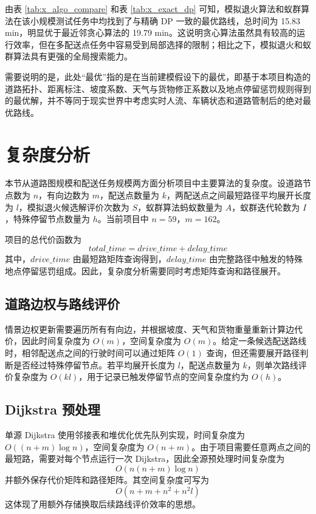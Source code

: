 \documentclass[12pt,a4paper,UTF8]{article}
\begin{document}
由表 \ref{tab:x_algo_compare} 和表 \ref{tab:x_exact_dp} 可知，模拟退火算法和蚁群算法在该小规模测试任务中均找到了与精确 DP 一致的最优路线，总时间为 15.83 min，明显优于最近邻贪心算法的 19.79 min。这说明贪心算法虽然具有较高的运行效率，但在多配送点任务中容易受到局部选择的限制；相比之下，模拟退火和蚁群算法具有更强的全局搜索能力。

需要说明的是，此处“最优”指的是在当前建模假设下的最优，即基于本项目构造的道路拓扑、距离标注、坡度系数、天气与货物修正系数以及地点停留惩罚规则得到的最优解，并不等同于现实世界中考虑实时人流、车辆状态和道路管制后的绝对最优路线。




\section{复杂度分析}

本节从道路图规模和配送任务规模两方面分析项目中主要算法的复杂度。设道路节点数为 $n$，有向边数为 $m$，配送点数量为 $k$，两配送点之间最短路径平均展开长度为 $l$，模拟退火候选解评价次数为 $S$，蚁群算法蚂蚁数量为 $A$，蚁群迭代轮数为 $I$，特殊停留节点数量为 $h$。当前项目中 $n=59$，$m=162$。

项目的总代价函数为
\[
    total\_time = drive\_time + delay\_time
\]
其中，$drive\_time$ 由最短路矩阵查询得到，$delay\_time$ 由完整路径中触发的特殊地点停留惩罚组成。因此，复杂度分析需要同时考虑矩阵查询和路径展开。

\subsection{道路边权与路线评价}

情景边权更新需要遍历所有有向边，并根据坡度、天气和货物重量重新计算边代价，因此时间复杂度为 $O(m)$，空间复杂度为 $O(m)$。给定一条候选配送路线时，相邻配送点之间的行驶时间可以通过矩阵 $O(1)$ 查询，但还需要展开路径判断是否经过特殊停留节点。若平均展开长度为 $l$，配送点数量为 $k$，则单次路线评价复杂度为 $O(kl)$，用于记录已触发停留节点的空间复杂度约为 $O(h)$。

\subsection{Dijkstra 预处理}

单源 Dijkstra 使用邻接表和堆优化优先队列实现，时间复杂度为 $O((n+m)\log n)$，空间复杂度为 $O(n+m)$。由于项目需要任意两点之间的最短路，需要对每个节点运行一次 Dijkstra，因此全源预处理时间复杂度为
\[
    O(n(n+m)\log n)
\]
并额外保存代价矩阵和路径矩阵。其空间复杂度可写为
\[
    O(n+m+n^2+n^2l)
\]
这体现了用额外存储换取后续路线评价效率的思想。
\end{document}
